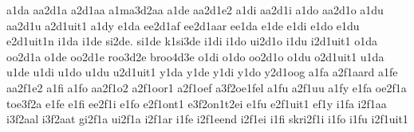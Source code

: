 {%
%
a1da
aa2d1a
a2d1aa
a1ma3d2aa
%
a1de
aa2d1e2
a1di
aa2d1i
a1do
aa2d1o
a1du
aa2d1u
a2d1uit1
a1dy
%
e1da
ee2d1af
ee2d1aar
ee1da
e1de
e1di
e1do
e1du
e2d1uit1n
%
i1da
i1de
si2de.
si1de
k1si3de
i1di
i1do
ui2d1o
i1du
i2d1uit1
%
o1da
oo2d1a
o1de
oo2d1e
roo3d2e
broo4d3e
o1di
o1do
oo2d1o
o1du
o2d1uit1
%
u1da
u1de
u1di
u1do
u1du
u2d1uit1
%
y1da
y1de
y1di
y1do
y2d1oog
%
%
%
a1fa
a2f1aard
a1fe
aa2f1e2
a1fi
a1fo
aa2f1o2
a2f1oor1
a2f1oef
a3f2oe1fel
a1fu
a2f1uu
a1fy
%
e1fa
oe2f1a
toe3f2a
e1fe
e1fi
ee2f1i
e1fo
e2f1ont1
e3f2on1t2ei
e1fu
e2f1uit1
ef1y
%
i1fa
i2f1aa
i3f2aal
i3f2aat
gi2f1a
ui2f1a
i2f1ar
i1fe
i2f1eend
i2f1ei
i1fi
skri2f1i
i1fo
i1fu
i2f1uit1
%
}
